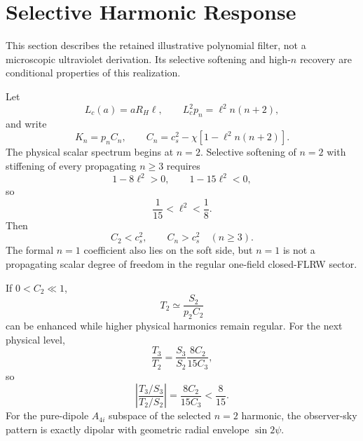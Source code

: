 \section{Selective Harmonic Response}

This section describes the retained illustrative polynomial filter, not a
microscopic ultraviolet derivation. Its selective softening and high-$n$
recovery are conditional properties of this realization.

Let
\[
L_c(a)=aR_H\ell,
\qquad L_c^2p_n=\ell^2n(n+2),
\]
and write
\[
K_n=p_nC_n,
\qquad
C_n=c_s^2-\chi\left[1-\ell^2n(n+2)\right].
\]
The physical scalar spectrum begins at \(n=2\). Selective softening of \(n=2\) with stiffening of every propagating \(n\ge3\) requires
\[
1-8\ell^2>0,
\qquad
1-15\ell^2<0,
\]
so
\[
\boxed{\frac1{15}<\ell^2<\frac18}.
\]
Then
\[
C_2<c_s^2,
\qquad
C_n>c_s^2\quad(n\ge3).
\]
The formal \(n=1\) coefficient also lies on the soft side, but \(n=1\) is not a propagating scalar degree of freedom in the regular one-field closed-FLRW sector.

If \(0<C_2\ll1\),
\[
T_2\simeq\frac{S_2}{p_2C_2}
\]
can be enhanced while higher physical harmonics remain regular. For the next physical level,
\[
\frac{T_3}{T_2}=\frac{S_3}{S_2}\frac{8C_2}{15C_3},
\]
so
\[
\boxed{
\left|\frac{T_3/S_3}{T_2/S_2}\right|
=\frac{8C_2}{15C_3}<\frac8{15}.
}
\]
For the pure-dipole \(A_{4i}\) subspace of the selected \(n=2\) harmonic, the observer-sky pattern is exactly dipolar with geometric radial envelope \(\sin2\psi\).
